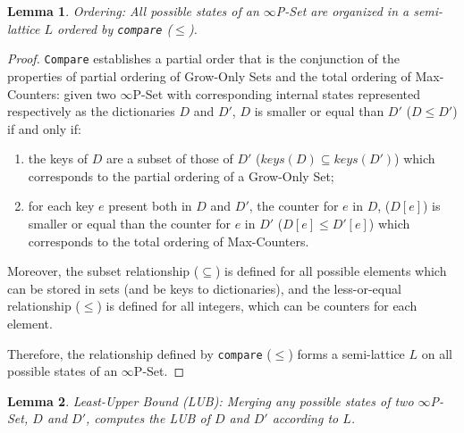 \documentclass[11pt, oneside]{article}   	%
\newtheorem{lemma}{Lemma}
\begin{document}
\begin{lemma}
Ordering: All possible states of an $\infty$P-Set are organized in a semi-lattice $L$ ordered by \texttt{compare} ($\leq$).
\end{lemma}
\begin{proof}
 \texttt{Compare} establishes a partial order that is the conjunction of the properties of partial ordering of Grow-Only Sets and the total ordering of Max-Counters: given two $\infty$P-Set with corresponding internal states represented respectively as the dictionaries $D$ and $D'$, $D$ is smaller or equal than $D'$ ($D \leq D'$) if and only if: 
 \begin{enumerate}
     \item the keys of $D$ are a subset of those of $D'$ ($\textit{keys}(D) \subseteq \textit{keys}(D')$) which corresponds to the partial ordering of a Grow-Only Set; 
     \item for each key $e$ present both in $D$ and $D'$, the counter for $e$ in $D$, ($D[e]$) is smaller or equal than the counter for $e$ in $D'$ ($D[e] \leq D'[e]$) which corresponds to the total ordering of Max-Counters. 
 \end{enumerate}
 
Moreover, the subset relationship ($\subseteq$) is defined for all possible elements which can be stored in sets (and be keys to dictionaries), and the less-or-equal relationship ($\leq$) is defined for all integers, which can be counters for each element. 

Therefore, the relationship defined by \texttt{compare} ($\leq$) forms a semi-lattice $L$ on all possible states of an $\infty$P-Set.
\end{proof}

\begin{lemma}
Least-Upper Bound (LUB): Merging any possible states of two $\infty$P-Set, $D$ and $D'$,  computes the LUB of $D$ and $D'$ according to $L$.
\end{lemma}
\end{document}
